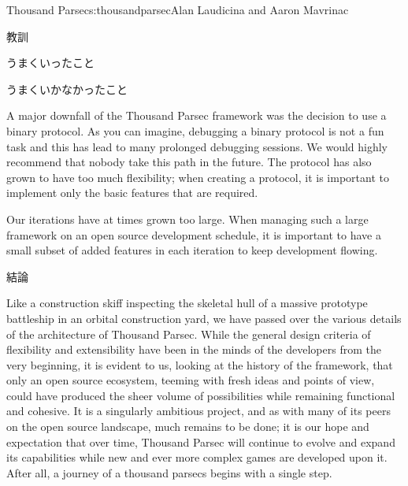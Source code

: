 \begin{aosachapter}{Thousand Parsec}{s:thousandparsec}{Alan Laudicina and Aaron Mavrinac}
\begin{aosasect1}{教訓}
\begin{aosasect2}{うまくいったこと}
\end{aosasect2}

\begin{aosasect2}{うまくいかなかったこと}

A major downfall of the Thousand Parsec framework was the decision to
use a binary protocol. As you can imagine, debugging a binary protocol
is not a fun task and this has lead to many prolonged debugging
sessions. We would highly recommend that nobody take this path in the
future. The protocol has also grown to have too much flexibility; when
creating a protocol, it is important to implement only the basic
features that are required.

Our iterations have at times grown too large. When managing such a
large framework on an open source development schedule, it is
important to have a small subset of added features in each iteration
to keep development flowing.

\end{aosasect2}

\begin{aosasect2}{結論}

Like a construction skiff inspecting the skeletal hull of a massive
prototype battleship in an orbital construction yard, we have passed
over the various details of the architecture of Thousand Parsec. While
the general design criteria of flexibility and extensibility have been
in the minds of the developers from the very beginning, it is evident
to us, looking at the history of the framework, that only an open
source ecosystem, teeming with fresh ideas and points of view, could
have produced the sheer volume of possibilities while remaining
functional and cohesive. It is a singularly ambitious project, and as
with many of its peers on the open source landscape, much remains to
be done; it is our hope and expectation that over time, Thousand
Parsec will continue to evolve and expand its capabilities while new
and ever more complex games are developed upon it. After all, a
journey of a thousand parsecs begins with a single step.

\end{aosasect2}

\end{aosasect1}

\end{aosachapter}
